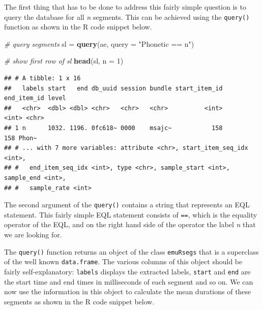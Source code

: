 \documentclass[]{book}
\newenvironment{Shaded}{\begin{snugshade}}{\end{snugshade}}
\newcommand{\CommentTok}[1]{\textcolor[rgb]{0.56,0.35,0.01}{\textit{#1}}}
\newcommand{\DataTypeTok}[1]{\textcolor[rgb]{0.13,0.29,0.53}{#1}}
\newcommand{\DecValTok}[1]{\textcolor[rgb]{0.00,0.00,0.81}{#1}}
\newcommand{\KeywordTok}[1]{\textcolor[rgb]{0.13,0.29,0.53}{\textbf{#1}}}
\newcommand{\NormalTok}[1]{#1}
\newcommand{\OperatorTok}[1]{\textcolor[rgb]{0.81,0.36,0.00}{\textbf{#1}}}
\newcommand{\StringTok}[1]{\textcolor[rgb]{0.31,0.60,0.02}{#1}}
\begin{document}
The first thing that has to be done to address this fairly simple question is to query the database for all \emph{n} segments. This can be achieved using the \texttt{query()} function as shown in the R code snippet below.

\begin{Shaded}
\begin{Highlighting}[]
\CommentTok{# query segments}
\NormalTok{sl =}\StringTok{ }\KeywordTok{query}\NormalTok{(ae, }\DataTypeTok{query =} \StringTok{"Phonetic == n"}\NormalTok{)}

\CommentTok{# show first row of sl}
\KeywordTok{head}\NormalTok{(sl, }\DataTypeTok{n =} \DecValTok{1}\NormalTok{)}
\end{Highlighting}
\end{Shaded}

\begin{verbatim}
## # A tibble: 1 x 16
##   labels start   end db_uuid session bundle start_item_id end_item_id level
##   <chr>  <dbl> <dbl> <chr>   <chr>   <chr>          <int>       <int> <chr>
## 1 n      1032. 1196. 0fc618~ 0000    msajc~           158         158 Phon~
## # ... with 7 more variables: attribute <chr>, start_item_seq_idx <int>,
## #   end_item_seq_idx <int>, type <chr>, sample_start <int>, sample_end <int>,
## #   sample_rate <int>
\end{verbatim}

The second argument of the \texttt{query()} contains a string that represents an EQL statement. This fairly simple EQL statement consists of \texttt{==}, which is the equality operator of the EQL, and on the right hand side of the operator the label \emph{n} that we are looking for.

The \texttt{query()} function returns an object of the class \texttt{emuRsegs} that is a superclass of the well known \texttt{data.frame}. The various columns of this object should be fairly self-explanatory: \texttt{labels} displays the extracted labels, \texttt{start} and \texttt{end} are the start time and end times in milliseconds of each segment and so on. We can now use the information in this object to calculate the mean durations of these segments as shown in the R code snippet below.

\begin{Shaded}
\end{Shaded}
\end{document}
